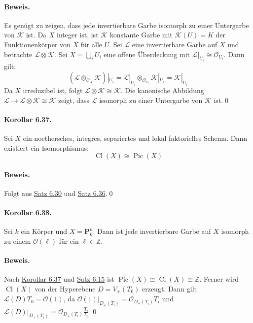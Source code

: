 \paragraph{Beweis.} Es genügt zu zeigen, dass jede invertierbare Garbe isomorph zu einer Untergarbe von $\mathcal{K}$ ist. Da $X$ integer ist, ist $\mathcal{K}$ konstante Garbe mit $\mathcal{K}(U)=K$ der Funktionenkörper von $X$ für alle $U$. Sei $\mathcal{L}$ eine invertierbare Garbe auf $X$ und betrachte $\mathcal{L}\otimes\mathcal{K}$. Sei $X=\bigcup_i U_i$ eine offene Überdeckung mit $\mathcal{L}|_{U_i}\cong\mathcal{O}_{U_i}$. Dann gilt:
\[(\mathcal{L}\otimes_{\mathcal{O}_X}\mathcal{K})|_{U_i}=\mathcal{L}|_{U_i}\otimes_{\mathcal{O}_{U_i}}\mathcal{K}|_{U_i}=\mathcal{K}|_{U_i} \]
Da $X$ irreduzibel ist, folgt $\mathcal{L}\otimes\mathcal{K}\cong\mathcal{K}$. Die kanonische Abbildung $\mathcal{L}\to\mathcal{L}\otimes\mathcal{K}\cong\mathcal{K}$ zeigt, dass $\mathcal{L}$ isomorph zu einer Untergarbe von $\mathcal{K}$ ist.\qed

\paragraph{Korollar 6.37.}\label{6.37} Sei $X$ ein noethersches, integres, separiertes und lokal faktorielles Schema. Dann existiert ein Isomorphismus:
\[\operatorname{Cl}(X)\cong\operatorname{Pic}(X) \]

\paragraph{Beweis.} Folgt aus \hyperref[6.30]{Satz 6.30} und \hyperref[6.36]{Satz 6.36}.\qed

\paragraph{Korollar 6.38.}\label{6.38} Sei $k$ ein Körper und $X=\mathbf{P}_k^n$. Dann ist jede invertierbare Garbe auf $X$ isomorph zu einem $\mathcal{O}(\ell)$ für ein $\ell\in\mathbb{Z}$.

\paragraph{Beweis.} Nach \hyperref[6.37]{Korollar 6.37} und \hyperref[6.15]{Satz 6.15} ist $\operatorname{Pic}(X)\cong \operatorname{Cl}(X)\cong\mathbb{Z}$. Ferner wird $\operatorname{Cl}(X)$ von der Hyperebene $D=V_+(T_0)$ erzeugt. Dann gilt $\mathcal{L}(D)T_0=\mathcal{O}(1)$, da $\mathcal{O}(1)|_{D_+(T_i)}=\mathcal{O}_{D_+(T_i)}T_i$ und $\mathcal{L}(D)|_{D_+(T_i)}=\mathcal{O}_{D_+(T_i)}\frac{T_i}{T_0}$.\qed

